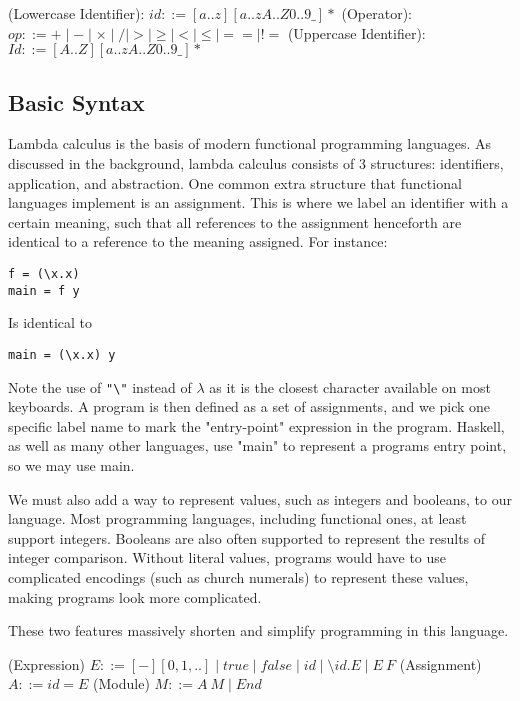 \begin{syntax}
\label{def:identifier_syntax}
(Lowercase Identifier): \(id ::= [a..z][a..zA..Z0..9\_]*\)\newline
(Operator): \(op ::= + \mid - \mid \times \mid / \mid > \mid \ge \mid < \mid \le \mid== \mid \mathrel{\mathtt{!=}} \)\newline
(Uppercase Identifier): \(Id ::= [A..Z][a..zA..Z0..9\_]*\)
\end{syntax}

\subsection{Basic Syntax}
Lambda calculus is the basis of modern functional programming languages. As discussed in the background, lambda calculus consists of 3 structures: identifiers, application, and abstraction. One common extra structure that functional languages implement is an assignment. This is where we label an identifier with a certain meaning, such that all references to the assignment henceforth are identical to a reference to the meaning assigned. For instance:
\begin{lstlisting}[]
f = (\x.x)
main = f y
\end{lstlisting}
Is identical to
\begin{lstlisting}[]
main = (\x.x) y
\end{lstlisting}
Note the use of \verb|"\"| instead of \(\lambda\) as it is the closest character available on most keyboards. A program is then defined as a set of assignments, and we pick one specific label name to mark the "entry-point" expression in the program. Haskell, as well as many other languages, use "main" to represent a programs entry point, so we may use main. 

We must also add a way to represent values, such as integers and booleans, to our language. Most programming languages, including functional ones, at least support integers. Booleans are also often supported to represent the results of integer comparison. Without literal values, programs would have to use complicated encodings (such as church numerals) to represent these values, making programs look more complicated. 

These two features massively shorten and simplify programming in this language.

\begin{syntax}
(Expression) \(E ::= [-][0, 1, ..] \mid true \mid false \mid id \mid \setminus id. E \mid E\:F\)\newline
(Assignment) \(A ::= id = E\)\newline
(Module) \(M ::= A\: M \mid End\)
\end{syntax}

